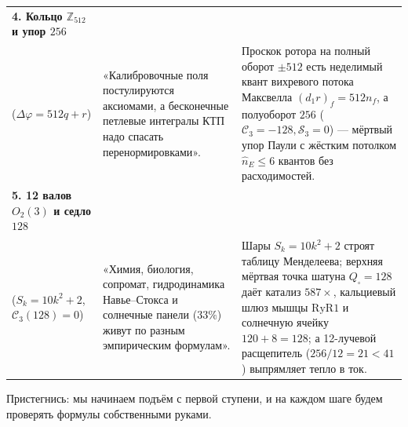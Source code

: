 \begin{table}[htbp]
\begin{tabular}{@{}p{}p{}p{}@{}}
\addlinespace[3pt]
\textbf{4. Кольцо $\mathbb{Z}_{512}$ и упор $256$}\\ ($\Delta\varphi = 512 q + r$) &
«Калибровочные поля постулируются аксиомами, а бесконечные петлевые интегралы КТП надо спасать перенормировками». &
Проскок ротора на полный оборот $\pm 512$ есть неделимый квант вихревого потока Максвелла $(d_1 r)_f = 512 n_f$, а полуоборот $256$ ($\mathcal{C}_3=-128, \mathcal{S}_3=0$) --- мёртвый упор Паули с жёстким потолком $\hat{n}_E\le 6$ квантов без расходимостей. \\
\addlinespace[3pt]
\textbf{5. 12 валов $O_2(3)$ и седло $128$}\\ ($S_k=10k^2+2$, $\mathcal{C}_3(128)=0$) &
«Химия, биология, сопромат, гидродинамика Навье--Стокса и солнечные панели ($33\%$) живут по разным эмпирическим формулам». &
Шары $S_k=10k^2+2$ строят таблицу Менделеева; верхняя мёртвая точка шатуна $Q_\square=128$ даёт катализ $587\times$, кальциевый шлюз мышцы $\mathrm{RyR1}$ и солнечную ячейку $120+8=128$; а 12-лучевой расщепитель ($256/12=21<41$) выпрямляет тепло в ток. \\
\bottomrule
\end{tabular}
\end{table}

Пристегнись: мы начинаем подъём с первой ступени, и на каждом шаге будем проверять формулы собственными руками.

